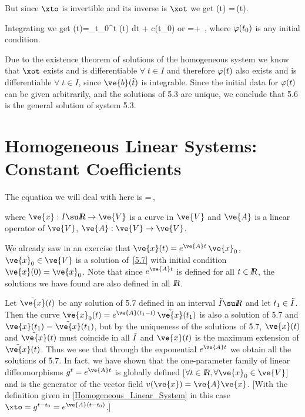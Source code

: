 But since $\xto$ is invertible and its inverse is $\xot$ we get
\beq
{} (t) =\xot\,(t).
\eeq

\noi Integrating we get
\beq
{}(t)=\int_{t_0}^t \xoti {}(\tilde t) \;d\tilde t + c(t_0)
\eeq
\noi or
\beq
\fit=\xto{} +
\xto\,\fito ,
\label{5.6}
\eeq
\noi where $\mbox{$\varphi(t_0)$}$ is any initial condition.

\espa

Due to the existence theorem of solutions of the homogeneous system
we know that $\xot$ exists and is differentiable $\forall\;t\in I$ and therefore
$\mbox{$\varphi (t)$}$ also exists and is differentiable $\forall\; t\in I$,
since $\ve{b}(\tilde t)$ is integrable. Since the initial data for $\mbox{$\varphi (t)$}$
can be given arbitrarily, and the solutions of \r{5.3} are
unique, we conclude that \r{5.6} is the general solution of system \r{5.3}.




\section{Homogeneous Linear Systems: Constant Coefficients}
\label{Homogeneous_Linear_Systems:_Constant_Coefficients}

The equation we will deal with here is 
\beq
{}=\,,      \label{5.7}
\eeq

\noi where $\ve{x} :I\su \re\to \ve{V}$ is a curve in $\ve{V}$ and $\ve{A}$ is a
linear operator of $\ve{V}$, $\ve{A}:\ve{V}\to \ve{V}$.

We already saw in an exercise that $\ve{x}(t)=e^{\ve{A}t}\,\ve{x}_0$, $\ve{x}_0\in \ve{V}$
is a solution of~\ref{5.7} with initial condition
$\ve{x}(0)=\ve{x}_0$. Note that since $e^{\ve{A}t}$ is defined for all
$t\in\mbox{\sl {l$\!\!\!\;\:\!$R}}$, the solutions we have found are also
defined in all $\mbox{\sl {l$\!\!\!\;\:\!$R}}$.

Let $\tilde{\ve{x}}(t)$ be any solution of \r{5.7} defined in an
interval $\ti I\su\re$ and let $t_1\in\tilde I$. Then the curve
$\ve{x}_0(t)=e^{\ve{A}(t_1-t)}\,\ti{\ve{x}} (t_1)$ is also a solution
of \r{5.7} and $\ve{x}(t_1)=\ti{\ve{x}}(t_1)$, but by the uniqueness of the solutions
of \r{5.7}, $\ve{x}(t)$ and $\ti{\ve{x}}(t)$ must coincide in all $\tilde I$ and
$\ve{x}(t)$ is the maximum extension of $\ti{\ve{x}}(t)$. Thus we see that
through the exponential $e^{\ve{A}t}$ we obtain all the solutions
of \r{5.7}. In fact, we have shown that the one-parameter family
of linear diffeomorphisms $g^t=e^{\ve{A}t}$ is globally defined
[$\forall t\in\re,\forall \ve{x}_0\in \ve{V}$] and is the generator of the vector
field $v(\ve{x})=\ve{A} \ve{x}$. 
[With the definition given in \ref{Homogeneous_Linear_System} in this case
$\xto=g^{t-t_0}=e^{\ve{A}(t-t_0)}$.]
\espa

